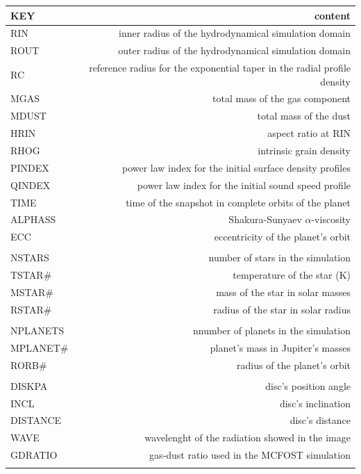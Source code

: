\documentclass[a4paper,10pt]{report}
\begin{document}
\begin{table}
    \begin{center}
        \begin{tabular}{l r}
        \toprule
        KEY & content \\
        \midrule   
        RIN & inner radius of the hydrodynamical simulation domain\\
        ROUT & outer radius of the hydrodynamical simulation domain\\
        RC & reference radius for the exponential taper in the radial profile density\\ 
        MGAS & total mass of the gas component\\
        MDUST & total mass of the dust\\
        HRIN & aspect ratio at RIN \\ 
        RHOG & intrinsic grain density\\ 
        PINDEX & power law index for the initial surface density profiles\\
        QINDEX & power law index for the initial sound speed profile \\
        TIME & time of the snapshot in complete orbits of the planet \\
        ALPHASS & Shakura-Sunyaev $\alpha$-viscosity\\
        ECC & eccentricity of the planet's orbit\\\\

        NSTARS & number of stars in the simulation \\
        TSTAR\# & temperature of the star (K)\\
        MSTAR\# & mass of the star in solar masses \\
        RSTAR\# & radius of the star in solar radius \\ \\
        
        NPLANETS & nnumber of planets in the simulation\\
        MPLANET\# & planet's mass in Jupiter's masses \\
        RORB\# & radius of the planet's orbit\\ \\
        
        DISKPA & disc's position angle\\
        INCL & disc's inclination\\
        DISTANCE & disc's distance \\
        WAVE & wavelenght of the radiation showed in the image\\
        GDRATIO & gas-dust ratio used in the MCFOST simulation \\ \\


\end{tabular}
\end{center}
\end{table}
\end{document}
